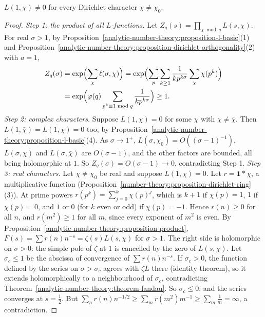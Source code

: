 \begin{theorem}[Dirichlet]\label{analytic-number-theory:theorem-l-one}
$L(1, \chi) \neq 0$ for every Dirichlet character $\chi \neq \chi_0$.
\end{theorem}

\begin{proof}
\emph{Step 1: the product of all $L$-functions.} Let $Z_q(s) = \prod_{\chi \bmod q}L(s, \chi)$. For real $\sigma > 1$, by Proposition~\ref{analytic-number-theory:proposition-l-basic}(1) and
Proposition~\ref{analytic-number-theory:proposition-dirichlet-orthogonality}(2) with $a = 1$,
\[
\begin{aligned}
Z_q(\sigma) &= \exp\Bigl(\sum_\chi\ell(\sigma, \chi)\Bigr) = \exp\Bigl(\sum_p\sum_{k \geq 1}\frac{1}{kp^{k\sigma}}\sum_\chi\chi(p^k)\Bigr) \\
&= \exp\Bigl(\varphi(q)\sum_{p^k \equiv 1 \bmod q}\frac{1}{kp^{k\sigma}}\Bigr) \geq 1.
\end{aligned}
\]
\emph{Step 2: complex characters.} Suppose $L(1, \chi) = 0$ for some $\chi$ with $\chi \neq \bar\chi$. Then $L(1, \bar\chi) = \overline{L(1, \chi)} = 0$ too, by
Proposition~\ref{analytic-number-theory:proposition-l-basic}(4). As $\sigma \to 1^+$, $L(\sigma, \chi_0) = O((\sigma - 1)^{-1})$, $L(\sigma, \chi)$ and $L(\sigma, \bar\chi)$ are $O(\sigma - 1)$, and the other factors
are bounded, all being holomorphic at $1$. So $Z_q(\sigma) = O(\sigma - 1) \to 0$, contradicting Step 1.
\emph{Step 3: real characters.} Let $\chi \neq \chi_0$ be real and suppose $L(1, \chi) = 0$. Let $r = \mathbf{1} * \chi$, a multiplicative function
(Proposition~\ref{number-theory:proposition-dirichlet-ring}(3)). At prime powers $r(p^k) = \sum_{j=0}^k\chi(p)^j$, which is $k + 1$ if $\chi(p) = 1$, $1$ if $\chi(p) = 0$, and $1$ or $0$ (for $k$ even
or odd) if $\chi(p) = -1$. Hence $r(n) \geq 0$ for all $n$, and $r(m^2) \geq 1$ for all $m$, since every exponent of $m^2$ is even. By Proposition~\ref{analytic-number-theory:proposition-product},
$F(s) = \sum r(n)n^{-s} = \zeta(s)L(s, \chi)$ for $\sigma > 1$. The right side is holomorphic on $\sigma > 0$: the simple pole of $\zeta$ at $1$ is cancelled by the zero of $L(s, \chi)$. Let $\sigma_c \leq 1$
be the abscissa of convergence of $\sum r(n)n^{-s}$. If $\sigma_c > 0$, the function defined by the series on $\sigma > \sigma_c$ agrees with $\zeta L$ there (identity theorem), so it extends
holomorphically to a neighbourhood of $\sigma_c$, contradicting Theorem~\ref{analytic-number-theory:theorem-landau}. So $\sigma_c \leq 0$, and the series converges at $s = \frac12$. But
$\sum_nr(n)n^{-1/2} \geq \sum_mr(m^2)m^{-1} \geq \sum_m\frac1m = \infty$, a contradiction.
\end{proof}

